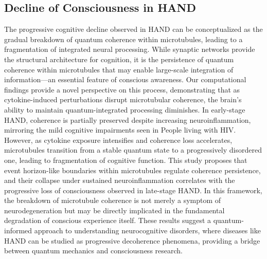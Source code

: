 \subsection{Decline of Consciousness in HAND}
The progressive cognitive decline observed in HAND can be conceptualized as the gradual breakdown of quantum coherence within microtubules, leading to a fragmentation of integrated neural processing. While synaptic networks provide the structural architecture for cognition, it is the persistence of quantum coherence within microtubules that may enable large-scale integration of information—an essential feature of conscious awareness. 
Our computational findings provide a novel perspective on this process, demonstrating that as cytokine-induced perturbations disrupt microtubular coherence, the brain’s ability to maintain quantum-integrated processing diminishes. In early-stage HAND, coherence is partially preserved despite increasing neuroinflammation, mirroring the mild cognitive impairments seen in People living with HIV. However, as cytokine exposure intensifies and coherence loss accelerates, microtubules transition from a stable quantum state to a progressively disordered one, leading to fragmentation of cognitive function.
This study proposes that event horizon-like boundaries within microtubules regulate coherence persistence, and their collapse under sustained neuroinflammation correlates with the progressive loss of consciousness observed in late-stage HAND. In this framework, the breakdown of microtubule coherence is not merely a symptom of neurodegeneration but may be directly implicated in the fundamental degradation of conscious experience itself. 
These results suggest a quantum-informed approach to understanding neurocognitive disorders, where diseases like HAND can be studied as progressive decoherence phenomena, providing a bridge between quantum mechanics and consciousness research.